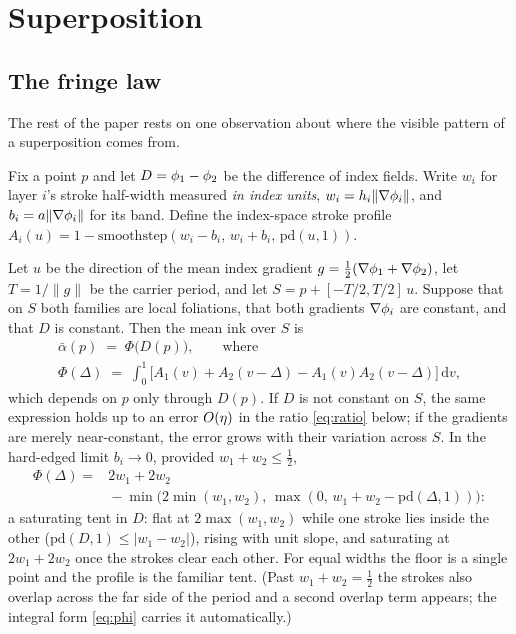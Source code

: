 \section{Superposition}
\label{sec:super}

\subsection{The fringe law}
\label{sec:fringe}

The rest of the paper rests on one observation about where the visible pattern
of a superposition comes from.

Fix a point $p$ and let $D=\phi_1-\phi_2$ be the difference of index fields. Write
$w_i$ for layer $i$'s stroke half-width measured \emph{in index units},
$w_i=h_i\lVert\nabla\phi_i\rVert$, and $b_i=a\lVert\nabla\phi_i\rVert$ for its
band. Define the index-space stroke profile
$A_i(u)=1-\mathrm{smoothstep}(w_i-b_i,\,w_i+b_i,\,\mathrm{pd}(u,1))$.

\begin{theorem}
\label{thm:fringe}
Let $u$ be the direction of the mean index gradient
$g=\tfrac12(\nabla\phi_1+\nabla\phi_2)$, let $T=1/\lVert g\rVert$ be the carrier
period, and let $S=p+[-T/2,T/2]\,u$. Suppose that on $S$ both families are local
foliations, that both gradients $\nabla\phi_i$ are constant, and that $D$ is
constant. Then the mean ink over $S$ is
\begin{equation}
  \label{eq:phi}
  \begin{gathered}
    \bar\alpha(p) \;=\; \Phi\big(D(p)\big), \qquad\text{where}\\
    \Phi(\Delta) \;=\; \int_0^1 \Big[A_1(v)+A_2(v-\Delta)-A_1(v)A_2(v-\Delta)\Big]\,\mathrm{d}v,
  \end{gathered}
\end{equation}
which depends on $p$ only through $D(p)$. If $D$ is not constant on $S$, the
same expression holds up to an error $O(\eta)$ in the ratio \eqref{eq:ratio}
below; if the gradients are merely near-constant, the error grows with their
variation across $S$. In the hard-edged limit $b_i\to0$, provided
$w_1+w_2\le\tfrac12$,
\begin{equation}
  \begin{split}
    \Phi(\Delta) = {}&2w_1+2w_2 \\
      &{}-\min\!\big(2\min(w_1,w_2),\,\max(0,\,w_1+w_2-\mathrm{pd}(\Delta,1))\big):
  \end{split}
  \label{eq:tent}
\end{equation}
a saturating tent in $D$: flat at $2\max(w_1,w_2)$ while one stroke lies
inside the other ($\mathrm{pd}(D,1)\le|w_1-w_2|$), rising with unit slope, and
saturating at $2w_1+2w_2$ once the strokes clear each other. For equal widths
the floor is a single point and the profile is the familiar tent. (Past
$w_1+w_2=\tfrac12$ the strokes also overlap across the far side of the period
and a second overlap term appears; the integral form \eqref{eq:phi} carries it
automatically.)
\end{theorem}

